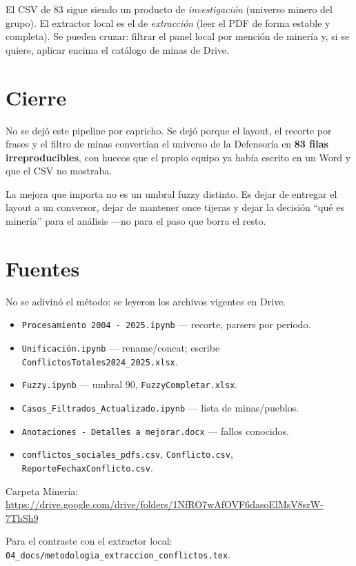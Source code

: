 \documentclass[11pt,a4paper]{article}
\begin{document}
El CSV de 83 sigue siendo un producto de \emph{investigación} (universo minero del grupo). El extractor local es el de \emph{extracción} (leer el PDF de forma estable y completa). Se pueden cruzar: filtrar el panel local por mención de minería y, si se quiere, aplicar encima el catálogo de minas de Drive.

\section{Cierre}

No se dejó este pipeline por capricho. Se dejó porque el layout, el recorte por frases y el filtro de minas convertían el universo de la Defensoría en \textbf{83 filas irreproducibles}, con huecos que el propio equipo ya había escrito en un Word y que el CSV no mostraba.

La mejora que importa no es un umbral fuzzy distinto. Es dejar de entregar el layout a un conversor, dejar de mantener once tijeras y dejar la decisión ``qué es minería'' para el análisis ---no para el paso que borra el resto.

\section{Fuentes}

No se adivinó el método: se leyeron los archivos vigentes en Drive.

\begin{itemize}
  \item \texttt{Procesamiento 2004 - 2025.ipynb} --- recorte, parsers por periodo.
  \item \texttt{Unificación.ipynb} --- rename/concat; escribe \texttt{ConflictosTotales2024\_2025.xlsx}.
  \item \texttt{Fuzzy.ipynb} --- umbral 90, \texttt{FuzzyCompletar.xlsx}.
  \item \texttt{Casos\_Filtrados\_Actualizado.ipynb} --- lista de minas/pueblos.
  \item \texttt{Anotaciones - Detalles a mejorar.docx} --- fallos conocidos.
  \item \texttt{conflictos\_sociales\_pdfs.csv}, \texttt{Conflicto.csv}, \texttt{ReporteFechaxConflicto.csv}.
\end{itemize}

Carpeta Minería: \url{https://drive.google.com/drive/folders/1NfRO7wAfOVF6dasoElMsV8srW-7ThSh9}

Para el contraste con el extractor local: \texttt{04\_docs/metodologia\_extraccion\_conflictos.tex}.
\end{document}
